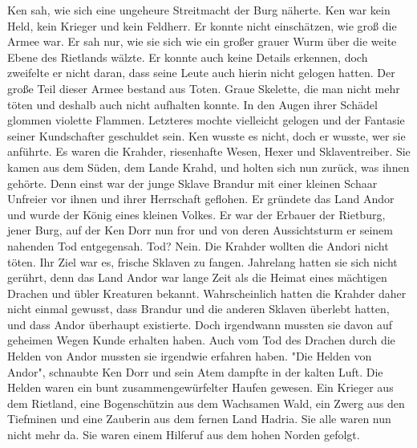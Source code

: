 \documentclass[10pt, a4paper, oneside]{book}
\begin{document}
\begin{multicols}{2}
Ken sah, wie sich eine ungeheure Streitmacht der Burg näherte. Ken war kein Held, kein Krieger und kein Feldherr. Er konnte nicht einschätzen, wie groß die Armee war. Er sah nur, wie sie sich wie ein großer grauer Wurm über die weite Ebene des Rietlands wälzte. Er konnte auch keine Details erkennen, doch zweifelte er nicht daran, dass seine Leute auch hierin nicht gelogen hatten. Der große Teil dieser Armee bestand aus Toten. Graue Skelette, die man nicht mehr töten und deshalb auch nicht aufhalten konnte. In den Augen ihrer Schädel glommen violette Flammen. Letzteres mochte vielleicht gelogen und der Fantasie seiner Kundschafter geschuldet sein. Ken wusste es nicht, doch er wusste, wer sie anführte. Es waren die Krahder, riesenhafte Wesen, Hexer und Sklaventreiber. Sie kamen aus dem Süden, dem Lande Krahd, und holten sich nun zurück, was ihnen gehörte. Denn einst war der junge Sklave Brandur mit einer kleinen Schaar Unfreier vor ihnen und ihrer Herrschaft geflohen. Er gründete das Land Andor und wurde der König eines kleinen Volkes. Er war der Erbauer der Rietburg, jener Burg, auf der Ken Dorr nun fror und von deren Aussichtsturm er seinem nahenden Tod entgegensah. Tod? Nein. Die Krahder wollten die Andori nicht töten. Ihr Ziel war es, frische Sklaven zu fangen. Jahrelang hatten sie sich nicht gerührt, denn das Land Andor war lange Zeit als die Heimat eines mächtigen Drachen und übler Kreaturen bekannt. Wahrscheinlich hatten die Krahder daher nicht einmal gewusst, dass Brandur und die anderen Sklaven überlebt hatten, und dass Andor überhaupt existierte. Doch irgendwann mussten sie davon auf geheimen Wegen Kunde erhalten haben. Auch vom Tod des Drachen durch die Helden von Andor mussten sie irgendwie erfahren haben. "Die Helden von Andor", schnaubte Ken Dorr und sein Atem dampfte in der kalten Luft. Die Helden waren ein bunt zusammengewürfelter Haufen gewesen. Ein Krieger aus dem Rietland, eine Bogenschützin aus dem Wachsamen Wald, ein Zwerg aus den Tiefminen und eine Zauberin aus dem fernen Land Hadria. Sie alle waren nun nicht mehr da. Sie waren einem Hilferuf aus dem hohen Norden gefolgt. 


\end{multicols}
\end{document}
